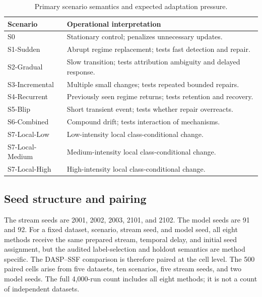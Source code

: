 \begin{table}[t]
\caption{Primary scenario semantics and expected adaptation pressure.}
\label{tab:scenario-semantics}
\centering
\scriptsize
\begin{tabular}{p{}p{}}
\toprule
Scenario & Operational interpretation\\
\midrule
S0 & Stationary control; penalizes unnecessary updates.\\
S1-Sudden & Abrupt regime replacement; tests fast detection and repair.\\
S2-Gradual & Slow transition; tests attribution ambiguity and delayed response.\\
S3-Incremental & Multiple small changes; tests repeated bounded repairs.\\
S4-Recurrent & Previously seen regime returns; tests retention and recovery.\\
S5-Blip & Short transient event; tests whether repair overreacts.\\
S6-Combined & Compound drift; tests interaction of mechanisms.\\
S7-Local-Low & Low-intensity local class-conditional change.\\
S7-Local-Medium & Medium-intensity local class-conditional change.\\
S7-Local-High & High-intensity local class-conditional change.\\
\bottomrule
\end{tabular}
\end{table}

\subsection{Seed structure and pairing}
The stream seeds are 2001, 2002, 2003, 2101, and 2102. The model seeds are 91 and 92. For a fixed dataset, scenario, stream seed, and model seed, all eight methods receive the same prepared stream, temporal delay, and initial seed assignment, but the audited label-selection and holdout semantics are method specific. The DASP--SSF comparison is therefore paired at the cell level. The 500 paired cells arise from five datasets, ten scenarios, five stream seeds, and two model seeds. The full 4,000-run count includes all eight methods; it is not a count of independent datasets.


